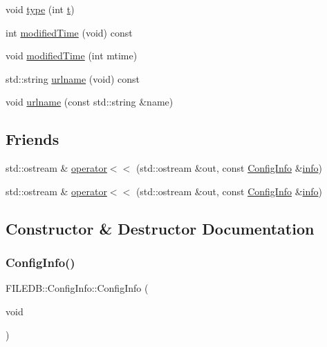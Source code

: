 \begin{DoxyCompactItemize}
\item 
void \mbox{\hyperlink{classFILEDB_1_1ConfigInfo_a8d65b3b00e90f7daa4ab65fae36ed024}{type}} (int \mbox{\hyperlink{hadron__timeslice_8cc_ac310d9181e916ba43604099aee272c71}{t}})
\item 
int \mbox{\hyperlink{classFILEDB_1_1ConfigInfo_a03212f15d26edbae21ea53bbce2b1793}{modified\+Time}} (void) const
\item 
void \mbox{\hyperlink{classFILEDB_1_1ConfigInfo_a5c250fc2d94faafa05f18d8126ccf0cb}{modified\+Time}} (int mtime)
\item 
std\+::string \mbox{\hyperlink{classFILEDB_1_1ConfigInfo_aae1f3e5b2bd95afcd655b4df4548dc1f}{urlname}} (void) const
\item 
void \mbox{\hyperlink{classFILEDB_1_1ConfigInfo_a49750ae80347780d48415cb7aac9a068}{urlname}} (const std\+::string \&name)
\end{DoxyCompactItemize}
\subsection*{Friends}
\begin{DoxyCompactItemize}
\item 
std\+::ostream \& \mbox{\hyperlink{classFILEDB_1_1ConfigInfo_a2aa453414301c12055ae76f2bfdc8f87}{operator$<$$<$}} (std\+::ostream \&out, const \mbox{\hyperlink{classFILEDB_1_1ConfigInfo}{Config\+Info}} \&\mbox{\hyperlink{structinfo}{info}})
\item 
std\+::ostream \& \mbox{\hyperlink{classFILEDB_1_1ConfigInfo_a2aa453414301c12055ae76f2bfdc8f87}{operator$<$$<$}} (std\+::ostream \&out, const \mbox{\hyperlink{classFILEDB_1_1ConfigInfo}{Config\+Info}} \&\mbox{\hyperlink{structinfo}{info}})
\end{DoxyCompactItemize}


\subsection{Constructor \& Destructor Documentation}
\mbox{\label{classFILEDB_1_1ConfigInfo_a5aa818d39aeb907f27e064cab48c3522}} 
\subsubsection{\texorpdfstring{ConfigInfo()}{ConfigInfo()}\hspace{0.1cm}{\footnotesize\ttfamily [1/4]}}
{\footnotesize\ttfamily F\+I\+L\+E\+D\+B\+::\+Config\+Info\+::\+Config\+Info (\begin{DoxyParamCaption}\item[{void}]{ }\end{DoxyParamCaption})}

